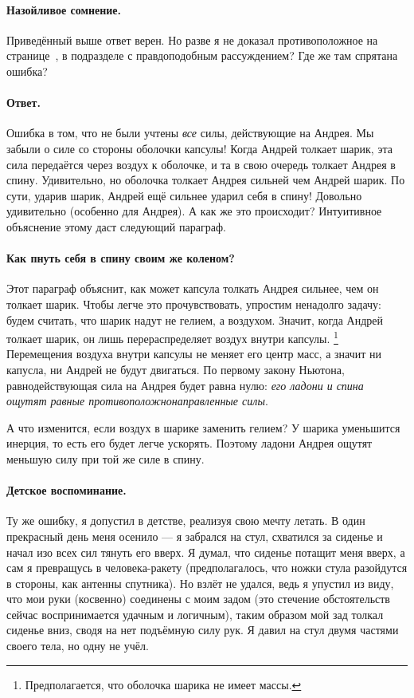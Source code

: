 \paragraph{Назойливое сомнение.}
Приведённый выше ответ верен.
Но разве я не доказал противоположное на странице~\pageref{Првдоподобное рассуждение}, в подразделе с правдоподобным рассуждением?
Где же там спрятана ошибка?

\paragraph{Ответ.}
Ошибка в том, что не были учтены \emph{все} силы, действующие на Андрея.
Мы забыли о силе со стороны оболочки капсулы!
Когда Андрей толкает шарик, эта сила передаётся через воздух к оболочке, и та в свою очередь толкает Андрея в спину.
Удивительно, но оболочка толкает Андрея сильней чем Андрей шарик.
По сути, ударив шарик, Андрей ещё сильнее ударил себя в спину!
Довольно удивительно (особенно для Андрея).
А как же это происходит?
Интуитивное объяснение этому даст следующий параграф.

\paragraph{Как пнуть себя в спину своим же коленом?}
Этот параграф объяснит, как может капсула толкать Андрея сильнее, чем он толкает шарик.
Чтобы легче это прочувствовать, упростим ненадолго задачу:
будем считать, что шарик надут не гелием, а воздухом.
Значит, когда Андрей толкает шарик, он лишь перераспределяет воздух внутри капсулы.%
\footnote{Предполагается, что оболочка шарика не имеет массы.}
Перемещения воздуха внутри капсулы не меняет его центр масс, а значит ни капусла, ни Андрей не будут двигаться.
По первому закону Ньютона, равнодействующая сила на Андрея будет равна нулю: \emph{его ладони и спина ощутят равные противоположнонаправленные силы}.

А что изменится, если воздух в шарике заменить гелием?
У шарика уменьшится инерция, то есть его будет легче ускорять.
Поэтому ладони Андрея ощутят меньшую силу при той же силе в спину.

\paragraph{Детское воспоминание.}
Ту же ошибку, я допустил в детстве, реализуя свою мечту летать.
В один прекрасный день меня осенило --- я забрался на стул, схватился за сиденье и начал изо всех сил тянуть его вверх.
Я думал, что сиденье потащит меня вверх, а сам я превращусь в человека-ракету (предполагалось, что ножки стула разойдутся в стороны, как антенны спутника).
Но взлёт не удался, ведь я упустил из виду, что мои руки (косвенно) соединены с моим задом
(это стечение обстоятельств сейчас воспринимается удачным и логичным),
таким образом мой зад толкал сиденье вниз, сводя на нет подъёмную силу рук.
Я давил на стул двумя частями своего тела, но одну не учёл.


